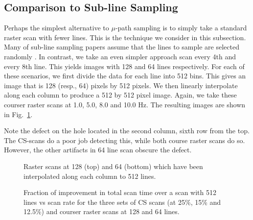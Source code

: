\documentclass[twocolumn,oneside]{IEEEtran/IEEEtran}
\begin{document}
\subsection{Comparison to Sub-line Sampling}
Perhaps the simplest alternative to $\mu$-path sampling is to simply
take a standard raster scan with fewer lines. This is the technique we
consider in this subsection. Many of sub-line sampling papers assume
that the lines to sample are selected randomly \cite{han_optimal_2018,
  Luo_nano_2015}. In contrast, we take an even simpler approach scan
every 4th and every 8th line. This yields images with 128 and 64 lines
respectively. For each of these scenarios, we first divide the data
for each line into 512 bins. This gives an image that is 128 (resp.,
64) pixels by 512 pixels. We then linearly interpolate along each
column to produce a 512 by 512 pixel image. Again, we take these
courser raster scans at 1.0, 5.0, 8.0 and 10.0 Hz. The resulting
images are shown in Fig.~\ref{fig:results_subline_images}.

Note the defect on the hole located in the second column, sixth row
from the top. The CS-scans do a poor job detecting this, while both
course raster scans do so. However, the other artifacts in 64 line
scan obscure the defect.

\begin{figure}
  \centering
  
  \caption{Raster scans at 128 (top) and 64 (bottom) which have been
    interpolated along each column to 512 lines.}
  \label{fig:results_subline_images}
\end{figure}

\begin{figure}
  
  \caption{Fraction of improvement in total scan time over a scan with
    512 lines vs scan rate for the three sets of CS scans (at 25\%,
    15\% and 12.5\%) and courser raster scans at 128 and 64 lines.}
  \label{fig:improve_512}
\end{figure}






%   
\end{document}
